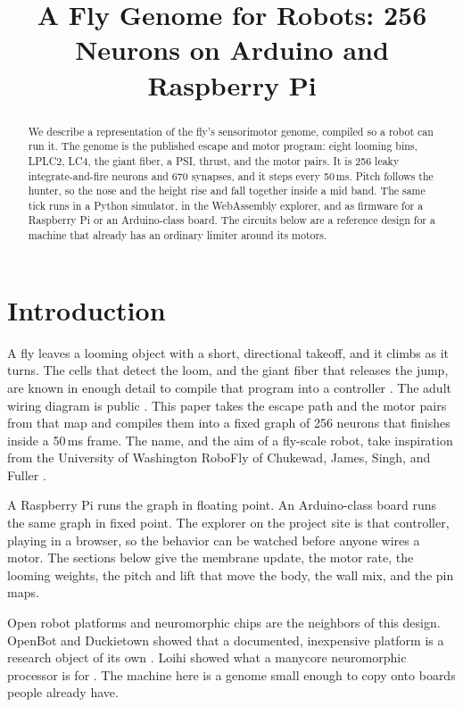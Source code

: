\documentclass[conference]{IEEEtran}
\begin{document}
\title{A Fly Genome for Robots: 256 Neurons on Arduino and Raspberry Pi}

\author{}

\maketitle

\begin{abstract}
We describe a representation of the fly's sensorimotor genome, compiled so a robot can run it.
The genome is the published escape and motor program: eight looming bins, LPLC2, LC4, the giant fiber, a PSI, thrust, and the motor pairs.
It is 256 leaky integrate-and-fire neurons and 670 synapses, and it steps every 50\,ms.
Pitch follows the hunter, so the nose and the height rise and fall together inside a mid band.
The same tick runs in a Python simulator, in the WebAssembly explorer, and as firmware for a Raspberry Pi or an Arduino-class board.
The circuits below are a reference design for a machine that already has an ordinary limiter around its motors.
\end{abstract}

\section{Introduction}
A fly leaves a looming object with a short, directional takeoff, and it climbs as it turns.
The cells that detect the loom, and the giant fiber that releases the jump, are known in enough detail to compile that program into a controller \cite{klapoetke2017,vonreyn2014}.
The adult wiring diagram is public \cite{dorkenwald2024,scheffer2020}.
This paper takes the escape path and the motor pairs from that map and compiles them into a fixed graph of 256 neurons that finishes inside a 50\,ms frame.
The name, and the aim of a fly-scale robot, take inspiration from the University of Washington RoboFly of Chukewad, James, Singh, and Fuller \cite{chukewad2021}.

A Raspberry Pi runs the graph in floating point.
An Arduino-class board runs the same graph in fixed point.
The explorer on the project site is that controller, playing in a browser, so the behavior can be watched before anyone wires a motor.
The sections below give the membrane update, the motor rate, the looming weights, the pitch and lift that move the body, the wall mix, and the pin maps.

Open robot platforms and neuromorphic chips are the neighbors of this design.
OpenBot and Duckietown showed that a documented, inexpensive platform is a research object of its own \cite{muller2021,paull2017}.
Loihi showed what a manycore neuromorphic processor is for \cite{davies2018}.
The machine here is a genome small enough to copy onto boards people already have.
\end{document}
